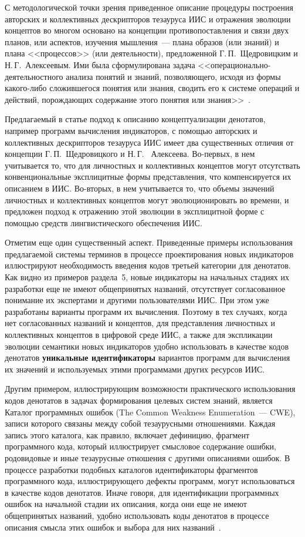 \begin{multicols}{2}
   С методологической точки зрения приведенное описание процедуры построения
авторских и коллективных дескрипторов тезауруса ИИС и отражения эволюции концептов
во многом основано на концепции противопоставления и связи двух планов, или аспектов,
изучения мышления~--- плана образов (или знаний) и плана <<процессов>> (или деятельности),
предложенной Г.\,П.~Щедровицким и Н.\,Г.~Алексеевым. Ими была сформулирована задача
<<операционально-деятельностного анализа понятий и знаний, позволяющего, исходя из
формы какого-либо сложившегося понятия или знания, сводить его к системе операций и
действий, порождающих содержание этого понятия или знания>>~\cite{38za, 39za}.

   Предлагаемый в статье подход к описанию концептуализации денотатов, например
программ вычисления индикаторов, с помощью авторских и коллективных дескрипторов
тезауруса ИИС имеет два существенных отличия от концепции Г.\,П.~Щед\-ро\-виц\-ко\-го и
Н.\,Г.~ Алексеева. Во-первых, в нем учитывается то, что для личностных и коллективных
концептов могут отсутствать конвенциональные эксплицитные формы представления, что
компенсируется их описанием в ИИС. Во-вторых, в нем учитывается то, что объемы
значений личностных и коллективных концептов могут эволюционировать во времени, и
предложен подход к отражению этой эволюции в эксплицитной форме с помощью средств
лингвистического обеспечения ИИС.

   Отметим еще один существенный аспект. Приведенные примеры использования
предлагаемой системы терминов в процессе проектирования новых индикаторов
иллюстрируют необходимость введения кодов третьей категории для денотатов. Как видно
из примеров раздела~5, новые индикаторы на начальных стадиях их разработки еще не
имеют общепринятых названий, отсутствует согласованное понимание их экспертами и
другими пользователями ИИС. При этом уже разработаны варианты программ их
вычисления. Поэтому в тех случаях, когда нет согласованных названий и концептов, для
представления личностных и коллективных концептов в цифровой среде ИИС, а также для
экспликации эволюции семантики новых индикаторов удобно использовать в качестве кодов
денотатов \textbf{уникальные идентификаторы} вариантов программ для вычисления их
значений и используемых этими программами других ресурсов ИИС.

   Другим примером, иллюстрирующим возможности практического использования кодов
денотатов в задачах формирования целевых систем знаний, является Каталог программных
ошибок (The Common Weakness Enumeration~--- CWE), записи которого связаны между
собой тезаурусными отношениями. Каждая запись этого каталога, как правило, включает
дефиницию, фрагмент программного кода, который иллюстрирует смысловое содержание
ошибки, родовидовые и иные тезаурусные отношения с другими описаниями ошибок. В
процессе разработки подобных каталогов идентификаторы фрагментов программного кода,
иллюстрирующего дефекты программ, могут использоваться в качестве кодов денотатов.
Иначе говоря, для идентификации программных ошибок на начальной стадии их описания,
когда они еще не имеют общепринятых названий, удобно использовать коды денотатов в
процессе описания смысла этих ошибок и выбора для них названий~\cite{40za}.


\end{multicols}
